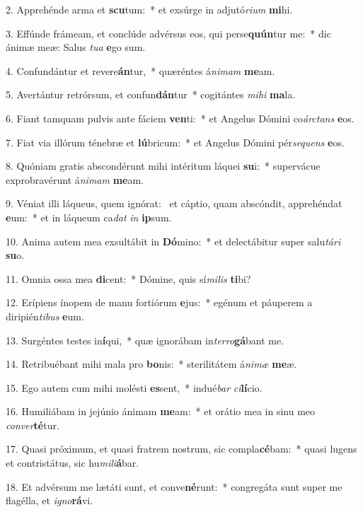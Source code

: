 2. Apprehénde arma et \textbf{scu}tum:~*  et exsúrge in adjutó\textit{ri}\textit{um} \textbf{mi}hi.\

3. Effúnde frámeam, et conclúde advérsus eos, qui perse\textbf{quún}tur me:~*  dic ánimæ meæ: Salus \textit{tu}\textit{a} \textbf{e}go sum.\

4. Confundántur et revere\textbf{án}tur,~*  quæréntes á\textit{ni}\textit{mam} \textbf{me}am.\

5. Avertántur retrórsum, et confun\textbf{dán}tur~*  cogitántes \textit{mi}\textit{hi} \textbf{ma}la.\

6. Fiant tamquam pulvis ante fáciem \textbf{ven}ti:~*  et Angelus Dómini co\textit{árc}\textit{tans} \textbf{e}os.\

7. Fiat via illórum ténebræ et \textbf{lú}bricum:~*  et Angelus Dómini pér\textit{se}\textit{quens} \textbf{e}os.\

8. Quóniam gratis abscondérunt mihi intéritum láquei \textbf{su}i:~*  supervácue exprobravérunt á\textit{ni}\textit{mam} \textbf{me}am.\

9. Véniat illi láqueus, quem ignórat: \dag\  et cáptio, quam abscóndit, apprehéndat \textbf{e}um:~*  et in láqueum ca\textit{dat} \textit{in} \textbf{ip}sum.\

10. Anima autem mea exsultábit in \textbf{Dó}mino:~*  et delectábitur super salu\textit{tá}\textit{ri} \textbf{su}o.\

11. Omnia ossa mea \textbf{di}cent:~*  Dómine, quis sí\textit{mi}\textit{lis} \textbf{ti}bi?\

12. Erípiens ínopem de manu fortiórum \textbf{e}jus:~*  egénum et páuperem a diripién\textit{ti}\textit{bus} \textbf{e}um.\

13. Surgéntes testes in\textbf{í}qui,~*  quæ ignorábam in\textit{ter}\textit{ro}\textbf{gá}bant me.\

14. Retribuébant mihi mala pro \textbf{bo}nis:~*  sterilitátem á\textit{ni}\textit{mæ} \textbf{me}æ.\

15. Ego autem cum mihi molésti \textbf{es}sent,~*  indué\textit{bar} \textit{ci}\textbf{lí}cio.\

16. Humiliábam in jejúnio ánimam \textbf{me}am:~*  et orátio mea in sinu meo \textit{con}\textit{ver}\textbf{té}tur.\

17. Quasi próximum, et quasi fratrem nostrum, sic compla\textbf{cé}bam:~*  quasi lugens et contristátus, sic hu\textit{mi}\textit{li}\textbf{á}bar.\

18. Et advérsum me lætáti sunt, et conve\textbf{né}runt:~*  congregáta sunt super me flagélla, et \textit{i}\textit{gno}\textbf{rá}vi.\

